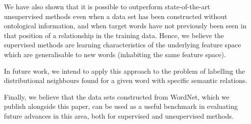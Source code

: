 \documentclass[11pt]{article}
\begin{document}
We have also shown that it is possible to outperform  state-of-the-art unsupervised methods even when a data set has been constructed without  ontological information, and when target words have not previously been seen in that position of a relationship in the training data.  Hence, we believe the supervised methods are learning characteristics of the underlying feature space which are generalisable to new words (inhabiting the same feature space).  

In future work, we intend to apply this approach to the problem of labelling the distributional neighbours found for a given word
 with specific semantic relations.

Finally, we believe that the data sets constructed from WordNet, which we publish alongside this paper,  can be used as a useful benchmark in evaluating future advances in this area, both for supervised and unsupervised methods.

\newpage



\end{document}
